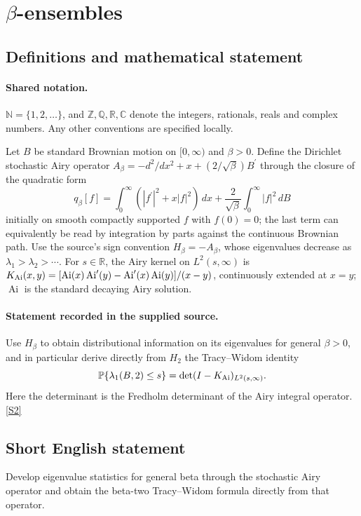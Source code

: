 \documentclass[11pt]{article}
\newcommand{\sref}[2]{\hyperlink{source:#1:#2}{[S#2]}}
\begin{document}
\section{\texorpdfstring{$\beta$}{beta}-ensembles}\label{statement}

\subsection{Definitions and mathematical statement}

\paragraph{Shared notation.}$\mathbb N=\{1,2,\ldots\}$, and $\mathbb Z,\mathbb Q,\mathbb R,\mathbb C$ denote the integers, rationals, reals and complex numbers. Any other conventions are specified locally.


Let $B$ be standard Brownian motion on $[0,\infty)$ and $\beta>0$. Define the Dirichlet stochastic Airy operator $A_\beta=-d^2/dx^2+x+(2/\sqrt\beta)B^{\prime}$ through the closure of the quadratic form \[q_\beta[f]=\int_0^\infty(|f^{\prime}|^2+x|f|^2)\,dx+\frac2{\sqrt\beta}\int_0^\infty|f|^2\,dB\] initially on smooth compactly supported $f$ with $f(0)=0$; the last term can equivalently be read by integration by parts against the continuous Brownian path. Use the source's sign convention $H_\beta=-A_\beta$, whose eigenvalues decrease as $\lambda_1>\lambda_2>\cdots$. For $s\in\mathbb R$, the Airy kernel on $L^2(s,\infty)$ is $K_{\rm Ai}(x,y)=[\operatorname{Ai}(x)\operatorname{Ai}^{\prime}(y)-\operatorname{Ai}^{\prime}(x)\operatorname{Ai}(y)]/(x-y)$, continuously extended at $x=y$; $\operatorname{Ai}$ is the standard decaying Airy solution.
\paragraph{Statement recorded in the supplied source.}
Use $H_\beta$ to obtain distributional information on its eigenvalues for general $\beta>0$, and in particular derive directly from $H_2$ the Tracy--Widom identity \[\mathbb P\{\lambda_1(B,2)\le s\}=\det(I-K_{\rm Ai})_{L^2(s,\infty)}.\] Here the determinant is the Fredholm determinant of the Airy integral operator. \sref{statement}{2}
\subsection{Short English statement}
Develop eigenvalue statistics for general beta through the stochastic Airy operator and obtain the beta-two Tracy--Widom formula directly from that operator.
\end{document}
